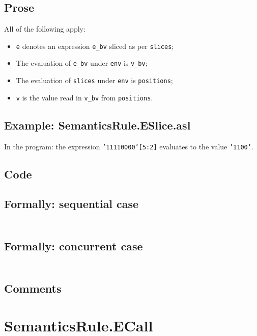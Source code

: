 \documentclass{book}
\begin{document}
  \subsection{Prose}
  All of the following apply:
  \begin{itemize}
  \item \texttt{e} denotes an expression \texttt{e\_bv} sliced as per \texttt{slices};
  \item The evaluation of \texttt{e\_bv} under \texttt{env} is \texttt{v\_bv};
  \item The evaluation of \texttt{slices} under \texttt{env} is \texttt{positions};
  \item \texttt{v} is the value read in \texttt{v\_bv} from \texttt{positions}.
  \end{itemize}

  \subsection{Example: SemanticsRule.ESlice.asl}
    In the program:
    the expression \texttt{'11110000'[5:2]} evaluates to the value \texttt{'1100'}.

  \subsection{Code}

  \subsection{Formally: sequential case}
  \begin{align}
  \end{align} 

  \subsection{Formally: concurrent case}
  \begin{align}
  \end{align} 

  \subsection{Comments}

\section{SemanticsRule.ECall \label{sec:SemanticsRule.ECall}}
\end{document}

